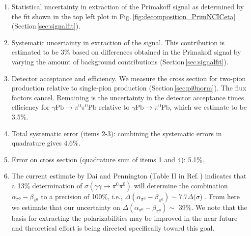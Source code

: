 \begin{enumerate}

\item
Statistical uncertainty in extraction of the Primakoff signal as determined by the fit shown in the top left plot in Fig.\,\ref{fig:decomposition_PrimNCICeta} (Section\,\ref{sec:signalfit}).


\item
Systematic uncertainty in extraction of the signal. This contribution is estimated to be 3\% based on differences obtained in the Primakoff signal by varying the amount of background contributions (Section\,\ref{sec:signalfit}).

\item 
Detector acceptance and efficiency. We measure the cross section for two-pion production relative to single-pion production (Section\,\ref{sec:pi0norm}). The flux factors cancel. Remaining is the uncertainty in the detector acceptance times efficiency for $\gamma \mathrm{Pb} \rightarrow \pi^0 \pi^0 \mathrm{Pb}$  relative to $\gamma \mathrm{Pb} \rightarrow \pi^0 \mathrm{Pb}$, which we estimate to be 3.5\%.

\item
Total systematic error (items 2-3): combining the systematic errors in quadrature gives 4.6\%.

\item 
Error on cross section (quadrature sum of items 1 and 4): 5.1\%.

\item
The current estimate by Dai and Pennington (Table II in Ref.\,\cite{Dai:2016ytz}) indicates
that a 13\% determination of
$\sigma(\gamma\gamma\rightarrow\pi^0\pi^0)$ will determine the
combination $\alpha_{\pi^0}-\beta_{\pi^0}$ to a precision of 100\%, i.e., $\Delta(\alpha_{\pi^0}-\beta_{\pi^0}) \sim 7.7\Delta(\sigma$) .
From here we estimate that our uncertainty on $\Delta(\alpha_{\pi^0}-\beta_{\pi^0}) \sim$ 39\%. We note that the basis for extracting the polarizabilities may be improved
in the near future and theoretical effort is being directed specifically toward this goal.

\end{enumerate}

